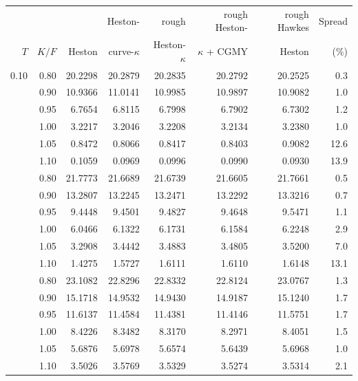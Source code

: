 \begin{tabular}{rrrrrrrr}
\toprule
 &  &  & Heston- & rough & rough Heston- & rough Hawkes & Spread\\
$T$ & $K/F$ & Heston & curve-$\kappa$ & Heston-$\kappa$ & $\kappa$ + CGMY & Heston & (\%)\\
\midrule
0.10 & 0.80 & 20.2298 & 20.2879 & 20.2835 & 20.2792 & 20.2525 & 0.3\\
 & 0.90 & 10.9366 & 11.0141 & 10.9985 & 10.9897 & 10.9082 & 1.0\\
 & 0.95 & 6.7654 & 6.8115 & 6.7998 & 6.7902 & 6.7302 & 1.2\\
 & 1.00 & 3.2217 & 3.2046 & 3.2208 & 3.2134 & 3.2380 & 1.0\\
 & 1.05 & 0.8472 & 0.8066 & 0.8417 & 0.8403 & 0.9082 & 12.6\\
 & 1.10 & 0.1059 & 0.0969 & 0.0996 & 0.0990 & 0.0930 & 13.9\\
\addlinespace
0.50 & 0.80 & 21.7773 & 21.6689 & 21.6739 & 21.6605 & 21.7661 & 0.5\\
 & 0.90 & 13.2807 & 13.2245 & 13.2471 & 13.2292 & 13.3216 & 0.7\\
 & 0.95 & 9.4448 & 9.4501 & 9.4827 & 9.4648 & 9.5471 & 1.1\\
 & 1.00 & 6.0466 & 6.1322 & 6.1731 & 6.1584 & 6.2248 & 2.9\\
 & 1.05 & 3.2908 & 3.4442 & 3.4883 & 3.4805 & 3.5200 & 7.0\\
 & 1.10 & 1.4275 & 1.5727 & 1.6111 & 1.6110 & 1.6148 & 13.1\\
\addlinespace
1.00 & 0.80 & 23.1082 & 22.8296 & 22.8332 & 22.8124 & 23.0767 & 1.3\\
 & 0.90 & 15.1718 & 14.9532 & 14.9430 & 14.9187 & 15.1240 & 1.7\\
 & 0.95 & 11.6137 & 11.4584 & 11.4381 & 11.4146 & 11.5751 & 1.7\\
 & 1.00 & 8.4226 & 8.3482 & 8.3170 & 8.2971 & 8.4051 & 1.5\\
 & 1.05 & 5.6876 & 5.6978 & 5.6574 & 5.6439 & 5.6968 & 1.0\\
 & 1.10 & 3.5026 & 3.5769 & 3.5329 & 3.5274 & 3.5314 & 2.1\\
\bottomrule
\end{tabular}
